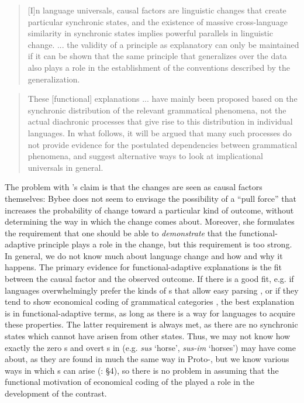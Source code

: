\documentclass[output=paper]{langsci/langscibook}
\begin{document}
\begin{quote}
[I]n language universals, causal factors are linguistic changes that create particular synchronic states, and the existence of massive cross-language similarity in synchronic states implies powerful parallels in linguistic change. ... the validity of a principle as explanatory can only be maintained if it can be shown that the same principle that generalizes over the data also plays a role in the establishment of the conventions described by the generalization. \citep[352]{Bybee1988}
\end{quote}

\begin{quote}
These [functional] explanations ... have mainly been proposed based on the synchronic distribution of the relevant grammatical phenomena, not the actual diachronic processes that give rise to this distribution in individual languages. In what follows, it will be argued that many such processes do not provide evidence for the postulated dependencies between grammatical phenomena, and suggest alternative ways to look at implicational universals in general. \citep[10]{Cristofaro2017}
\end{quote}

The problem with ’s claim is that the changes are seen as causal factors themselves: Bybee does not seem to envisage the possibility of a “pull force” that increases the probability of change toward a particular kind of outcome, without determining the way in which the change comes about. Moreover, she formulates the requirement that one should be able to \textit{demonstrate} that the functional-adaptive principle plays a role in the change, but this requirement is too strong. In general, we do not know much about language change and how and why it happens. The primary evidence for functional-adaptive explanations is the fit between the causal factor and the observed outcome. If there is a good fit, e.g. if languages overwhelmingly prefer the kinds of s that allow easy parsing \citep{Hawkins2014_VarEff}, or if they tend to show economical coding of grammatical categories \citep{Haspelmath2008_FreqIcon}, the best explanation is in functional-adaptive terms, as long as there is a way for languages to acquire these properties. The latter requirement is always met, as there are no synchronic states which cannot have arisen from other states. Thus, we may not know how exactly the zero s and overt s in  (e.g. \textit{sus} ‘horse’, \textit{sus-im} ‘horses’) may have come about, as they are found in much the same way in Proto-, but we know various ways in which s can arise (\citealt{Cristofaro2013}: §4), so there is no problem in assuming that the functional motivation of economical coding of the  played a role in the development of the contrast.
\end{document}
